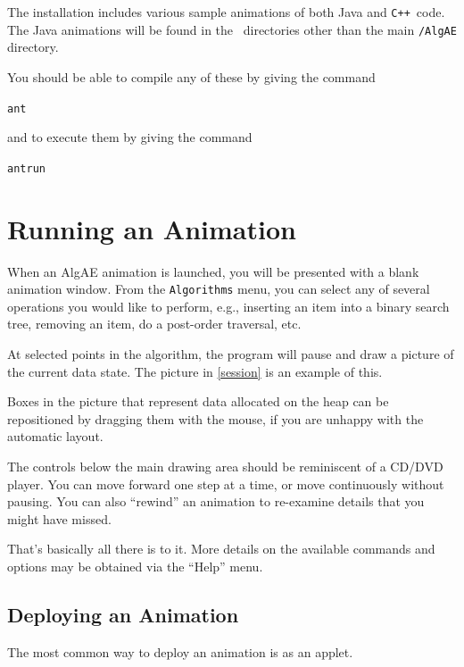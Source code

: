 \documentclass[11pt,titlepage]{book}
\newcommand{\algae}{{\sc AlgAE}}
\newcommand{\cpp}{{\tt C++}}
\begin{document}
The installation includes various sample animations of both Java and
\cpp\ code.  The Java animations will be found in the \Root\ directories other than the main \Root\texttt{/AlgAE} directory.

You should be able to compile any of these by giving the command
\begin{alltt}
ant
\end{alltt}
and to execute them by giving the command
\begin{alltt}
ant run
\end{alltt}


\chapter{Running an Animation}

When an \algae{} animation is launched, you will be presented with a
blank animation window. From the {\tt Algorithms} menu, you can select
any of several operations you would like to perform, e.g., inserting
an item into a binary search tree, removing an item, do a post-order
traversal, etc.

At selected points in the algorithm, the program will pause and draw a
picture of the current data state. The picture in
\autoref{session} is an example of this.

Boxes in the picture that represent data allocated on the heap can be
repositioned by dragging them with the mouse, if you are unhappy with
the automatic layout.

The controls below the main drawing area should be reminiscent of a
CD/DVD player. You can move forward one step at a time, or move
continuously without pausing. You can also ``rewind'' an animation to
re-examine details that you might have missed.


That's basically all there is to it.   More details on the available
commands and options may be obtained via the ``Help'' menu.




\section{Deploying an Animation}\label{deploying}

The most common way to deploy an animation is as an applet.
\end{document}
